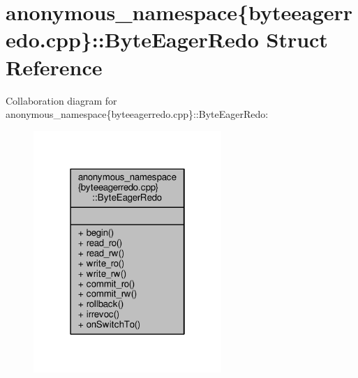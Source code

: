 \hypertarget{structanonymous__namespace_02byteeagerredo_8cpp_03_1_1ByteEagerRedo}{\section{anonymous\-\_\-namespace\{byteeagerredo.\-cpp\}\-:\-:Byte\-Eager\-Redo Struct Reference}
\label{structanonymous__namespace_02byteeagerredo_8cpp_03_1_1ByteEagerRedo}
}


Collaboration diagram for anonymous\-\_\-namespace\{byteeagerredo.\-cpp\}\-:\-:Byte\-Eager\-Redo\-:
\nopagebreak
\begin{figure}[H]
\begin{center}
\leavevmode
\includegraphics[width=202pt]{structanonymous__namespace_02byteeagerredo_8cpp_03_1_1ByteEagerRedo__coll__graph}
\end{center}
\end{figure}
